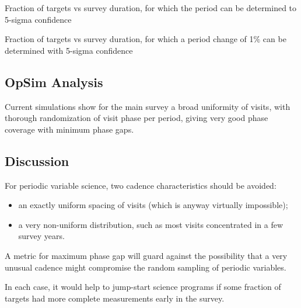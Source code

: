 Fraction of targets vs survey duration, for which the period can be determined to 5-sigma confidence

Fraction of targets vs survey duration, for which a period change of 1$\%$ can be determined with 5-sigma confidence



\subsection{OpSim Analysis}
\label{sec:keyword:analysis}

Current simulations show for the main survey a broad uniformity of visits, with thorough randomization of visit phase per period, giving very good phase coverage with minimum phase gaps.



\subsection{Discussion}
\label{sec:keyword:discussion}

For periodic variable science, two cadence characteristics should be avoided:
\begin{itemize}
\item an exactly uniform spacing of visits (which is anyway virtually impossible); \
\item a very non-uniform distribution, such as most visits concentrated in a few survey years.
 \end{itemize}

A metric for maximum phase gap will guard against the possibility that a very unusual cadence might compromise the random sampling of periodic variables.

In each case, it would help to jump-start science programs if some fraction of targets had more complete measurements early in the survey.



\navigationbar
